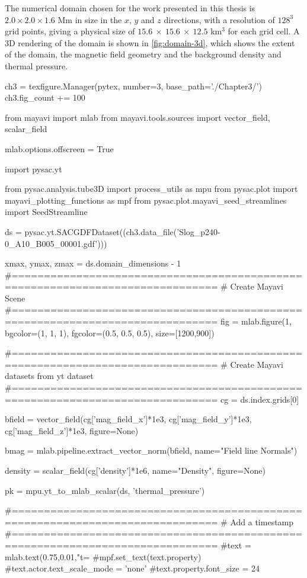 The numerical domain chosen for the work presented in this thesis is $2.0 \times 2.0 \times 1.6$ Mm in size in the $x$, $y$ and $z$ directions, with a resolution of $128^3$ grid points, giving a physical size of $15.6\ \times\ 15.6\ \times\ 12.5$ km$^3$ for each grid cell.
A 3D rendering of the domain is shown in \cref{fig:domain-3d}, which shows the extent of the domain, the magnetic field geometry and the background density and thermal pressure.



\begin{pycode}[chapter3a]
ch3 = texfigure.Manager(pytex, number=3, base_path='./Chapter3/')
ch3.fig_count += 100

from mayavi import mlab
from mayavi.tools.sources import vector_field, scalar_field

mlab.options.offscreen = True

import pysac.yt

from pysac.analysis.tube3D import process_utils as mpu
from pysac.plot import mayavi_plotting_functions as mpf
from pysac.plot.mayavi_seed_streamlines import SeedStreamline

ds = pysac.yt.SACGDFDataset((ch3.data_file('Slog_p240-0_A10_B005_00001.gdf')))

xmax, ymax, zmax = ds.domain_dimensions - 1
#==============================================================================
# Create Mayavi Scene
#==============================================================================
fig = mlab.figure(1, bgcolor=(1, 1, 1), fgcolor=(0.5, 0.5, 0.5),
size=[1200,900])


#==============================================================================
# Create Mayavi datasets from yt dataset
#==============================================================================
cg = ds.index.grids[0]

bfield = vector_field(cg['mag_field_x']*1e3,
                      cg['mag_field_y']*1e3,
                      cg['mag_field_z']*1e3,
                      figure=None)
                      
bmag = mlab.pipeline.extract_vector_norm(bfield, name="Field line Normals")

density = scalar_field(cg['density']*1e6, name="Density", figure=None)

pk = mpu.yt_to_mlab_scalar(ds, 'thermal_pressure')

#==============================================================================
# Add a timestamp
#==============================================================================
#text = mlab.text(0.75,0.01,"t=%
#mpf.set_text(text.property)
#text.actor.text_scale_mode = 'none'
#text.property.font_size = 24



\end{pycode}
